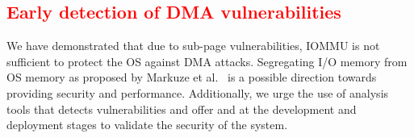 \subsection{\textcolor{red}{Early detection of DMA vulnerabilities}}
We have demonstrated that due to sub-page vulnerabilities, IOMMU is not sufficient to protect the OS against DMA attacks. Segregating I/O memory from OS memory as proposed by Markuze et al.~\cite{MMT16,MSMT18} is a possible direction towards providing security and performance. Additionally, we urge the use of analysis tools that detects \subpage{} vulnerabilities and offer \tool{} and \dkasan at the development and deployment stages to validate the security of the system.




